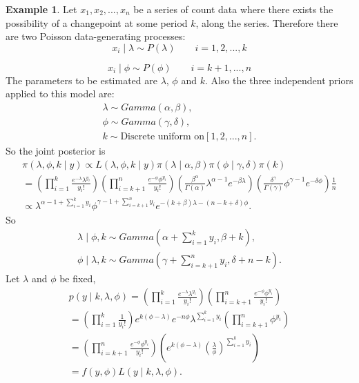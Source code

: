 \documentclass[lecture,12pt,]{pcms-l}
\numberwithin{section}{chapter}
\numberwithin{equation}{chapter}
\theoremstyle{plain}
\theoremstyle{definition}
\newtheorem{example}{Example}[section]
\theoremstyle{definition}
\begin{document}
\begin{example}
Let $x_1,x_2,...,x_n$ be a series of count data where there exists the possibility of a changepoint at some period $k$, along the series. Therefore there are two Poisson data-generating processes:
\begin{equation}
x_i \mid \lambda \sim P(\lambda) \qquad i=1,2,...,k
\end{equation}

\begin{equation}
x_i \mid \phi \sim P(\phi) \qquad i=k+1,...,n
\end{equation}
The parameters to be estimated are $\lambda$, $\phi$ and $k$. Also the three independent priors applied to this model are:
\begin{equation*}
\begin{split}
\lambda \sim Gamma(\alpha , \beta),
\\
\phi \sim Gamma(\gamma , \delta),
\\
k \sim \text{Discrete uniform on} \left [ 1,2,...,n \right ].
\end{split}
\end{equation*}
So the joint posterior is 
\begin{equation}
\begin{split}
\pi(\lambda, \phi, k\mid y) \propto L(\lambda, \phi, k \mid y)\pi(\lambda \mid \alpha, \beta )  \pi(\phi \mid \gamma, \delta)\pi(k)
\\
=(\prod_{i=1}^{k}\frac{e^{- \lambda}\lambda^{y_i}}{y_i !})(\prod_{i=k+1}^{n}\frac{e^{- \phi}\phi^{y_i}}{y_i !}) (\frac{\beta^{\alpha}}{\Gamma(\alpha)}\lambda^{\alpha-1}e^{- \beta \lambda})(\frac{\delta^{\gamma}}{\Gamma(\gamma)}\phi^{\gamma-1}e^{- \delta \phi})\frac{1}{n}
\\
\propto \lambda^{\alpha-1 + \sum_{i=1}^{k}y_i} \phi^{\gamma-1 + \sum_{i=k+1}^{n}y_i} e^{- (k+\beta) \lambda-(n-k+\delta)\phi}.
\end{split}
\end{equation}
So 
\begin{equation*}
\begin{split}
\lambda\mid \phi,k \sim Gamma(\alpha+ \sum_{i=1}^{k}y_i, \beta +k),
\\
\phi \mid \lambda,k \sim Gamma(\gamma+ \sum_{i=k+1}^{n}y_i, \delta +n -k).
\end{split}
\end{equation*}
Let $\lambda$ and $\phi$ be fixed,
\begin{equation}
\begin{split}
p(y \mid k, \lambda, \phi) = (\prod_{i=1}^{k}\frac{e^{- \lambda}\lambda^{y_i}}{y_i !})(\prod_{i=k+1}^{n}\frac{e^{- \phi}\phi^{y_i}}{y_i !})
\\
= (\prod_{i=1}^{k}\frac{1}{y_i !}) e^{k(\phi-\lambda)}e^{-n\phi} \lambda^{\sum_{i=1}^{k}y_i}(\prod_{i=k+1}^{n}\phi^{y_i})
\\
= (\prod_{i=k+1}^{n}\frac{e^{- \phi}\phi^{y_i}}{y_i !})(e^{k(\phi-\lambda)}(\frac{\lambda}{\phi})^{\sum_{i=1}^{k} y_i})
\\
= f(y,\phi)L(y \mid k, \lambda, \phi).
\end{split}
\end{equation}
\end{example}
\end{document}
